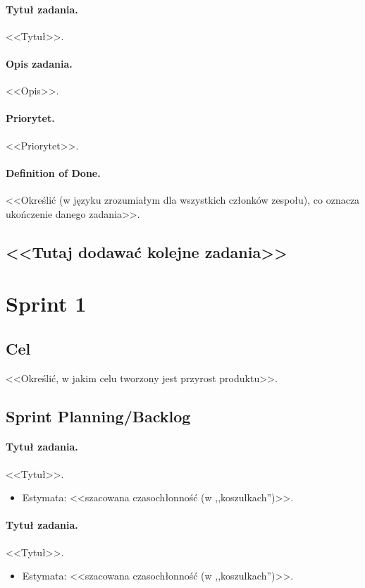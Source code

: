 \documentclass[a4paper]{article}
\begin{document}
\paragraph{Tytuł zadania.} <<Tytuł>>.
\paragraph{Opis zadania.} <<Opis>>.
\paragraph{Priorytet.} <<Priorytet>>.
\paragraph{Definition of Done.} <<Określić (w języku zrozumiałym dla wszystkich członków zespołu), co oznacza ukończenie danego zadania>>.

\subsection*{<<Tutaj dodawać kolejne zadania>>}

\section{Sprint 1}
\subsection{Cel} <<Określić, w jakim celu tworzony jest przyrost produktu>>.
\subsection{Sprint Planning/Backlog}

\paragraph{Tytuł zadania.} <<Tytuł>>.
\begin{itemize}
\item Estymata: <<szacowana czasochłonność (w ,,koszulkach'')>>.
\end{itemize}

\paragraph{Tytuł zadania.} <<Tytuł>>.
\begin{itemize}
\item Estymata: <<szacowana czasochłonność (w ,,koszulkach'')>>.
\end{itemize}
\end{document}
